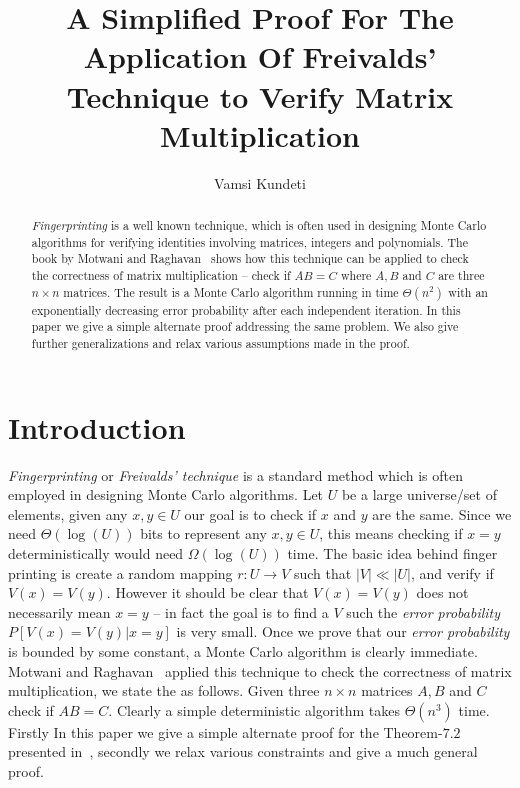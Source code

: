 \documentclass[runningheads]{llncs}
\begin{document}
\title{A Simplified Proof For The Application Of Freivalds' 
Technique to Verify Matrix Multiplication}


\author{Vamsi Kundeti}
 \maketitle

\begin{abstract}
{\em Fingerprinting} is a well known technique, which is often used in
designing Monte Carlo algorithms for verifying identities involving matrices,
integers and polynomials. The book by Motwani and Raghavan~\cite{motwani1995}
shows how this technique can be applied to check the correctness of matrix 
multiplication -- check if $AB=C$ where $A,B$ and $C$ are three $n\times n$ matrices. 
The result is a Monte Carlo algorithm running in time $\Theta(n^2)$ with an exponentially 
decreasing error probability after each independent iteration. In this paper we 
give a simple alternate proof addressing the same problem. We also give further 
generalizations and relax various assumptions made in the proof.
\end{abstract}

\section{Introduction}
{\em Fingerprinting} or {\em Freivalds' technique} is a standard method which is often
employed in designing Monte Carlo algorithms. Let $U$ be a large universe/set of elements,
given any $x,y\in U$ our goal is to check if $x$ and $y$ are the same. Since we need 
$\Theta(\log(U))$ bits to represent any $x,y \in U$, this means checking if $x=y$ 
deterministically would need $\Omega(\log(U))$ time. The basic idea behind finger printing
is create a random mapping $r:U\rightarrow V$ such that $|V| \ll |U|$, and verify if $V(x)=V(y)$.
However it should be clear that $V(x)=V(y)$ does not necessarily mean $x=y$ -- in fact the goal is
to find a $V$ such the {\em error probability} $P[V(x)=V(y)|x=y]$ is very small. Once we prove
that our {\em error probability} is bounded by some constant, a Monte Carlo algorithm is clearly
immediate. Motwani and Raghavan~\cite{motwani1995} applied this technique to check the correctness
of matrix multiplication, we state the as follows. Given three $n\times n$ matrices $A,B$ and $C$ 
check if $AB=C$. Clearly a simple deterministic algorithm takes $\Theta(n^3)$ time. Firstly In 
this paper we give a simple alternate proof for the Theorem-$7.2$ presented in~\cite{motwani1995},
secondly we relax various constraints and give a much general proof.
\end{document}
